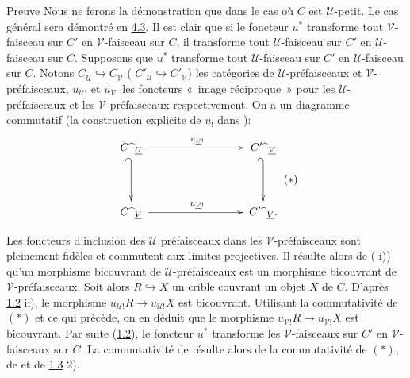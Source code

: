 \documentclass[10pt]{../fichiers-configuration-latex/smfart}
\begin{document}
\begin{enonce*}[remark]{Preuve}
Nous ne ferons la démonstration que dans le cas où $C$ est
$𝒰$-petit. Le cas général sera démontré en
\hyperref[III.subsec4.3]{4.3}. Il est clair que si le foncteur $u^\ast$
transforme tout $𝒱$-faisceau sur $C'$ en
$𝒱$-faisceau sur $C$, il transforme tout
$𝒰$-faisceau sur $C'$ en $𝒰$-faisceau sur $C$.
Supposons que $u^\ast$ transforme tout $𝒰$-faisceau sur $C'$
en $𝒰$-faisceau sur $C$. Notons
$C^{\widehat{\phantom{,}}}_{𝒰}\hookrightarrow
C^{\widehat{\phantom{,}}}_{𝒱}$ (\resp
${C'}^{\widehat{\phantom{,}}}_{𝒰}\hookrightarrow
{C'}_{𝒱}^{\widehat{\phantom{,}}}$) les catégories de
$𝒰$-préfaisceaux et $𝒱$-préfaisceaux,
$u_{𝒰!}$ et $u_{𝒱!}$ les foncteurs « image
réciproque » pour les $𝒰$-préfaisceaux et les
$𝒱$-préfaisceaux respectivement. On a un diagramme
commutatif (\cf la construction explicite de $u_{!}$ dans
):
\[\vcenter{
  \xymatrix@C=3cm@R=1.25cm@M=.2cm{
C\widehat{\phantom{a}}_{\underline{U}} \ar[r]^{u_{{\underline{U}}!}}
\ar @{_{(}->}[d]&
C'\widehat{\phantom{a}}_{\underline{V}} \ar @{_{(}->}[d]\\
C\widehat{\phantom{a}}_{\underline{V}}
\ar[r]^{u_{{\underline{V}}!}}&
C'\widehat{\phantom{a}}_{\underline{V}}. }}\leqno{(*)}
\]
Les foncteurs d'inclusion des $𝒰$ préfaisceaux dans les
$𝒱$-préfaisceaux sont pleinement fidèles et commutent
aux limites projectives. Il résulte alors de (
i)) qu'un morphisme bicouvrant de $𝒰$-préfaisceaux est
un morphisme bicouvrant de $𝒱$-préfaisceaux. Soit alors
$R\hookrightarrow X$ un crible couvrant un objet $X$ de $C$.
D'après \hyperref[III.prop1.2]{1.2} ii), le morphisme $u_{𝒰!}
R\rightarrow u_{𝒰!}X$ est bicouvrant. Utilisant la
commutativité de $(\ast)$ et ce qui précède, on en
déduit que le morphisme $u_{𝒱!}R\rightarrow
u_{𝒱!}X$ est bicouvrant. Par suite (\hyperref[III.prop1.2]{1.2}), le
foncteur $u^\ast$ transforme les $𝒱$-faisceaux sur $C'$ en
$𝒱$-faisceaux sur $C$. La commutativité de
 résulte alors de la commutativité de
$(\ast)$, de  et de \hyperref[III.prop1.3]{1.3} 2).
\end{enonce*}
\end{document}
